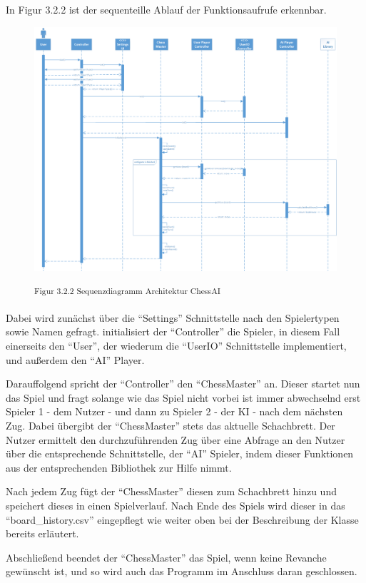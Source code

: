 In Figur 3.2.2 ist der sequenteille Ablauf der Funktionsaufrufe erkennbar.

\begin{figure}[h]
\centering
\includegraphics[width=\textwidth]{images/architecture_sequence_diagram.png}

\textsuperscript{Figur 3.2.2 Sequenzdiagramm Architektur ChessAI}
\end{figure}

Dabei wird zunächst über die ``Settings'' Schnittstelle nach den Spielertypen sowie Namen gefragt. initialisiert der ``Controller'' die Spieler, in diesem Fall einerseits den ``User'', der wiederum die ``UserIO'' Schnittstelle implementiert, und außerdem den ``AI'' Player. 

Darauffolgend spricht der ``Controller'' den ``ChessMaster'' an. Dieser startet nun das Spiel und fragt solange wie das Spiel nicht vorbei ist immer abwechselnd erst Spieler 1 - dem Nutzer - und dann zu Spieler 2 - der KI - nach dem nächsten Zug. Dabei übergibt der ``ChessMaster'' stets das aktuelle Schachbrett. Der Nutzer ermittelt den durchzuführenden Zug über eine Abfrage an den Nutzer über die entsprechende Schnittstelle, der ``AI'' Spieler, indem dieser Funktionen aus der entsprechenden Bibliothek zur Hilfe nimmt.

Nach jedem Zug fügt der ``ChessMaster'' diesen zum Schachbrett hinzu und speichert dieses in einen Spielverlauf. Nach Ende des Spiels wird dieser in das ``board\_history.csv'' eingepflegt wie weiter oben bei der Beschreibung der Klasse bereits erläutert.

Abschließend beendet der ``ChessMaster'' das Spiel, wenn keine Revanche gewünscht ist, und so wird auch das Programm im Anschluss daran geschlossen.


